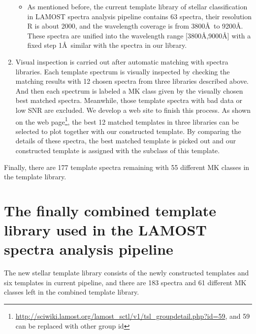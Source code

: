 \documentclass[manuscript]{aastex}
\begin{document}
\begin{enumerate}
\begin{itemize}
        \item As mentioned before, the current template library of stellar classification in LAMOST spectra analysis pipeline contains 63 spectra,
        their resolution R is about 2000, and the wavelength coverage is from 3800\AA\ to 9200\AA.
        These spectra are unified into the wavelength range [3800\AA,9000\AA] with a fixed step 1\AA\ similar with the spectra in our library.
    \end{itemize}
\item Visual inspection is carried out  after automatic  matching with spectra libraries.
Each template spectrum is visually inspected by checking the matching results with 12 chosen spectra from three libraries described above.
And then each spectrum is labeled a MK class given by the   visually chosen best matched spectra.
Meanwhile, those template spectra with bad data or low SNR are excluded.
We develop a web site to finish this process.
As shown on the web page\footnote{\url{http://sciwiki.lamost.org/lamost_sctl/v1/tsl_groupdetail.php?id=59}, and 59 can be replaced with other group id},
the best 12 matched templates in three libraries can be  selected to plot together with our constructed template.
By comparing the details of these spectra,
the best matched template is picked out and our constructed template is assigned with the subclass of this template.


\end{enumerate}

Finally,  there are 177 template spectra remaining with 55 different MK classes in the template library.

\section{The finally combined template library used in the LAMOST spectra analysis pipeline}
\label{sect:Results}
The new stellar template library consists of the  newly constructed templates and six templates in current pipeline,
and there are 183 spectra and 61 different MK classes  left in the combined template library.
\end{document}
